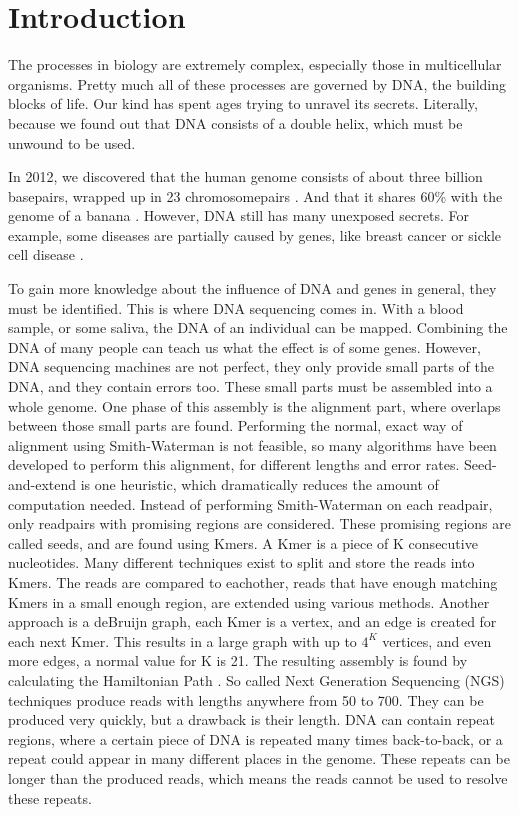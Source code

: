 \documentclass[../main/thesis.tex]{subfiles}
\begin{document}
\chapter{Introduction}
\ifdefined\main
\else

\fi

The processes in biology are extremely complex, especially those in multicellular organisms.
Pretty much all of these processes are governed by DNA, the building blocks of life.
Our kind has spent ages trying to unravel its secrets.
Literally, because we found out that DNA consists of a double helix, which must be unwound to be used.

In 2012, we discovered that the human genome consists of about three billion basepairs, wrapped up in 23 chromosomepairs \cite{human_genome_project}.
And that it shares 60\% with the genome of a banana \cite{banana}.
However, DNA still has many unexposed secrets.
For example, some diseases are partially caused by genes, like breast cancer or sickle cell disease \cite{genomic_diseases}.

To gain more knowledge about the influence of DNA and genes in general, they must be identified.
This is where DNA sequencing comes in.
With a blood sample, or some saliva, the DNA of an individual can be mapped.
Combining the DNA of many people can teach us what the effect is of some genes.
However, DNA sequencing machines are not perfect, they only provide small parts of the DNA, and they contain errors too.
These small parts must be assembled into a whole genome.
One phase of this assembly is the alignment part, where overlaps between those small parts are found.
Performing the normal, exact way of alignment using Smith-Waterman is not feasible, so many algorithms have been developed to perform this alignment, for different lengths and error rates.
Seed-and-extend is one heuristic, which dramatically reduces the amount of computation needed.
Instead of performing Smith-Waterman on each readpair, only readpairs with promising regions are considered.
These promising regions are called seeds, and are found using Kmers.
A Kmer is a piece of K consecutive nucleotides.
Many different techniques exist to split and store the reads into Kmers.
The reads are compared to eachother, reads that have enough matching Kmers in a small enough region, are extended using various methods.
Another approach is a deBruijn graph, each Kmer is a vertex, and an edge is created for each next Kmer.
This results in a large graph with up to $4^K$ vertices, and even more edges, a normal value for K is 21.
The resulting assembly is found by calculating the Hamiltonian Path \cite{Euler_Hamil_paths}.
So called Next Generation Sequencing (NGS) techniques produce reads with lengths anywhere from 50 to 700.
They can be produced very quickly, but a drawback is their length.
DNA can contain repeat regions, where a certain piece of DNA is repeated many times back-to-back, or a repeat could appear in many different places in the genome.
These repeats can be longer than the produced reads, which means the reads cannot be used to resolve these repeats.
\end{document}
